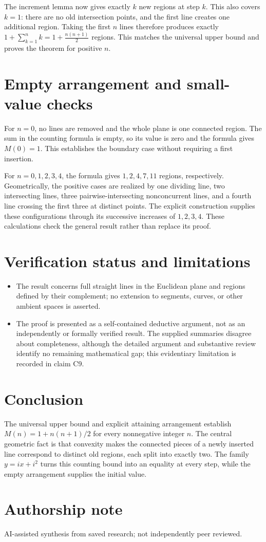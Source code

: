 \documentclass[11pt]{article}
\begin{document}
The increment lemma now gives exactly $k$ new regions at step $k$. This also covers $k=1$: there are no old intersection points, and the first line creates one additional region. Taking the first $n$ lines therefore produces exactly
$1+\sum_{k=1}^{n}k=1+\frac{n(n+1)}{2}$
regions. This matches the universal upper bound and proves the theorem for positive $n$.

\section{Empty arrangement and small-value checks}
For $n=0$, no lines are removed and the whole plane is one connected region. The sum in the counting formula is empty, so its value is zero and the formula gives $M(0)=1$. This establishes the boundary case without requiring a first insertion.

For $n=0,1,2,3,4$, the formula gives $1,2,4,7,11$ regions, respectively. Geometrically, the positive cases are realized by one dividing line, two intersecting lines, three pairwise-intersecting nonconcurrent lines, and a fourth line crossing the first three at distinct points. The explicit construction supplies these configurations through its successive increases of $1,2,3,4$. These calculations check the general result rather than replace its proof.

\section{Verification status and limitations}
\begin{itemize}
\item The result concerns full straight lines in the Euclidean plane and regions defined by their complement; no extension to segments, curves, or other ambient spaces is asserted.
\item The proof is presented as a self-contained deductive argument, not as an independently or formally verified result. The supplied summaries disagree about completeness, although the detailed argument and substantive review identify no remaining mathematical gap; this evidentiary limitation is recorded in claim C9.
\end{itemize}
\section{Conclusion}
The universal upper bound and explicit attaining arrangement establish $M(n)=1+n(n+1)/2$ for every nonnegative integer $n$. The central geometric fact is that convexity makes the connected pieces of a newly inserted line correspond to distinct old regions, each split into exactly two. The family $y=ix+i^2$ turns this counting bound into an equality at every step, while the empty arrangement supplies the initial value.

\section*{Authorship note}
AI-assisted synthesis from saved research; not independently peer reviewed.
\end{document}

